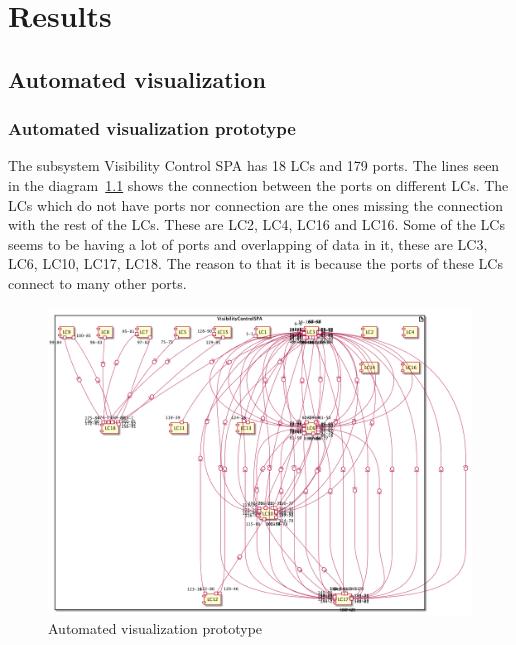 \chapter{Results}
\label{results}

\section{Automated visualization}
\subsection{Automated visualization prototype}
\label{RE:automated_visualization_prototype}
The subsystem Visibility Control SPA has 18 LCs and 179 ports. The lines seen in the diagram~\ref{fig:visualization_one} shows the connection between the ports on different LCs. The LCs which do not have ports nor connection are the ones missing the connection with the rest of the LCs. These are LC2, LC4, LC16 and LC16. Some of the LCs seems to be having a lot of ports and overlapping of data in it, these are LC3, LC6, LC10, LC17, LC18. The reason to that it is because the ports of these LCs connect to many other ports.  

\begin{figure}[H]
\centering
\captionsetup{justification=centering}
\vspace{0cm}%
\includegraphics[width=1\linewidth]{figure/results/visualization_1.png}
\caption{Automated visualization prototype}
\label{fig:visualization_one}
\end{figure}

